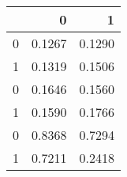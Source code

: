 \begin{tabular}{lrr}
\toprule
{} &       0 &       1 \\
\midrule
0 &  0.1267 &  0.1290 \\
1 &  0.1319 &  0.1506 \\
0 &  0.1646 &  0.1560 \\
1 &  0.1590 &  0.1766 \\
0 &  0.8368 &  0.7294 \\
1 &  0.7211 &  0.2418 \\
\bottomrule
\end{tabular}
